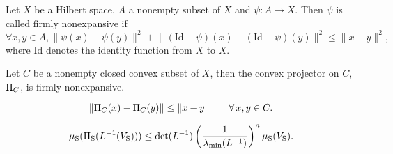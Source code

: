 \begin{definition}
Let $X$ be a Hilbert space, $A$ a nonempty subset of $X$ and $\psi: A \to X$. Then $\psi$ is called firmly nonexpansive if
$$\forall x, y \in A, \lVert \psi(x) - \psi(y) \rVert^2 + \lVert (\text{Id} - \psi)(x)- (\text{Id} - \psi)(y) \rVert^2 \leq \lVert x - y \rVert^2,$$
where Id denotes the identity function from $X$ to $X$.
\end{definition}

\begin{theorem}[from \cite{combettes}]
Let $C$ be a nonempty closed convex subset of $X$, then the convex projector on $C$, $\Pi_C$, is firmly nonexpansive.
\end{theorem}

\begin{corollary}\label{cor:proj}
\begin{equation} \lVert \Pi_C(x) - \Pi_C(y) \rVert \leq \lVert x - y \rVert \qquad \forall\, x,y \in C.
\end{equation}
\end{corollary}

\begin{lemma} \label{lemma:lip}
\begin{equation}
\mu_{\text{S}}(\Pi_{\text{S}}(L^{-1}(V_{\text{S}}))) \leq \det(L^{-1}) \left(\frac{1}{\lambda_{\min}(L^{-1})}\right)^n \mu_{\text{S}}(V_{\text{S}}).
\end{equation}   
\end{lemma}

